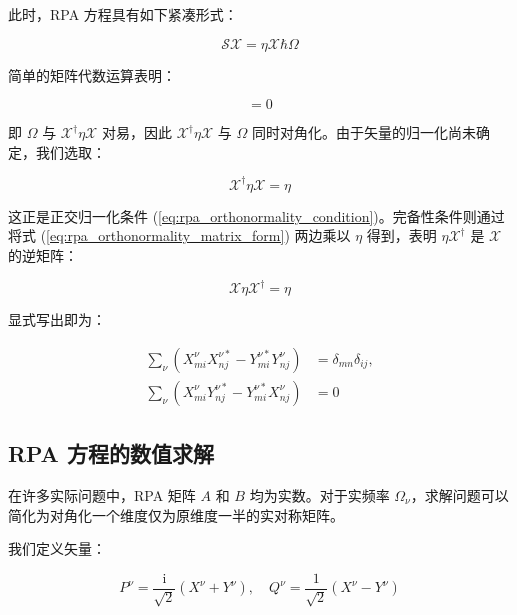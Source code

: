 此时，RPA 方程具有如下紧凑形式：

\begin{equation}
\mathcal{S}\mathcal{X}=\eta\mathcal{X}\hbar\Omega\label{eq:rpa_compact_matrix_form}
\end{equation}

简单的矩阵代数运算表明：

\begin{equation}
[\Omega,\mathcal{X}^{\dagger}\eta\mathcal{X}]=0\label{eq:rpa_commutator_omega_x}
\end{equation}

即 $\Omega$ 与 $\mathcal{X}^{\dagger}\eta\mathcal{X}$ 对易，因此 $\mathcal{X}^{\dagger}\eta\mathcal{X}$
与 $\Omega$ 同时对角化。由于矢量的归一化尚未确定，我们选取：

\begin{equation}
\mathcal{X}^{\dagger}\eta\mathcal{X}=\eta\label{eq:rpa_orthonormality_matrix_form}
\end{equation}

这正是正交归一化条件 (\ref{eq:rpa_orthonormality_condition})。完备性条件则通过将式 (\ref{eq:rpa_orthonormality_matrix_form})
两边乘以 $\eta$ 得到，表明 $\eta\mathcal{X}^{\dagger}$ 是 $\mathcal{X}$ 的逆矩阵：

\begin{equation}
\mathcal{X}\eta\mathcal{X}^{\dagger}=\eta\label{eq:rpa_completeness_matrix_form}
\end{equation}

显式写出即为：

\begin{align}
\sum_{\nu}\left(X^{\nu}_{mi}X^{\nu*}_{nj}-Y^{\nu*}_{mi}Y^{\nu}_{nj}\right) & =\delta_{mn}\delta_{ij},\nonumber \\
\sum_{\nu}\left(X^{\nu}_{mi}Y^{\nu*}_{nj}-Y^{\nu*}_{mi}X^{\nu}_{nj}\right) & =0\label{eq:rpa_closure_explicit}
\end{align}


\subsection{RPA 方程的数值求解\label{subsec:8.4.4_RPA=0065B9=007A0B=007684=006570=00503C=006C42=0089E3}}

在许多实际问题中，RPA 矩阵 $A$ 和 $B$ 均为实数。对于实频率 $\Omega_{\nu}$，求解问题可以简化为对角化一个维度仅为原维度一半的实对称矩阵。

我们定义矢量：

\begin{equation}
P^{\nu}=\frac{\mathrm{i}}{\sqrt{2}}(X^{\nu}+Y^{\nu}),\quad Q^{\nu}=\frac{1}{\sqrt{2}}(X^{\nu}-Y^{\nu})\label{eq:rpa_pq_vectors_def}
\end{equation}

